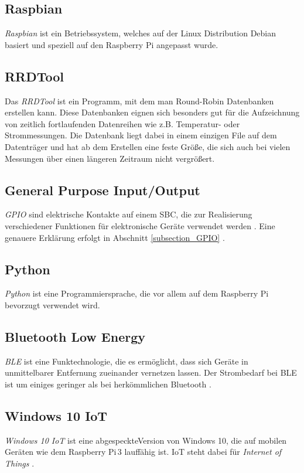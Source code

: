 \subsection*{Raspbian}
\textit{Raspbian} ist ein Betriebssystem, welches auf der Linux Distribution Debian basiert und speziell auf den Raspberry Pi angepasst wurde.

\subsection*{RRDTool}
Das \textit{RRDTool} ist ein Programm, mit dem man Round-Robin Datenbanken erstellen kann. Diese Datenbanken eignen sich besonders gut für die Aufzeichnung von zeitlich fortlaufenden Datenreihen wie z.B. Temperatur- oder Strommessungen. Die Datenbank liegt dabei in einem einzigen File auf dem Datenträger und hat ab dem Erstellen eine feste Größe, die sich auch bei vielen Messungen über einen längeren Zeitraum nicht vergrößert. 

\subsection*{General Purpose Input/Output}
\textit{\ac{GPIO}} sind elektrische Kontakte auf einem SBC, die zur Realisierung verschiedener Funktionen für elektronische Geräte verwendet werden \citep{Raspberri_Pi_Handbuch}. Eine genauere Erklärung erfolgt in Abschnitt \ref{subsection_GPIO} .

\subsection*{Python}
\textit{Python} ist eine Programmiersprache, die vor allem auf dem Raspberry Pi bevorzugt verwendet wird.

\subsection*{Bluetooth Low Energy}
\textit{\ac{BLE}} ist eine Funktechnologie, die es ermöglicht, dass sich Geräte in unmittelbarer Entfernung zueinander vernetzen lassen. Der Strombedarf bei \ac{BLE} ist um einiges geringer als bei herkömmlichen Bluetooth \citep{Bluetooth_Low_Energy}.
\subsection*{Windows 10 IoT}
\textit{Windows 10 IoT} ist eine \glqq abgespeckte\grqq \;Version von Windows 10, die auf mobilen Geräten wie dem Raspberry Pi\,3 lauffähig ist. IoT steht dabei für \textit{Internet of Things} \citep{Raspberri_Pi_Handbuch}.

